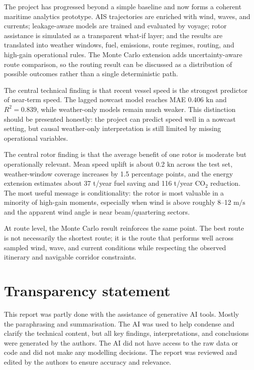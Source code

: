\documentclass[10pt,a4paper]{article}
\newcommand{\kn}{\ensuremath{\mathrm{kn}}}
\newcommand{\ms}{\ensuremath{\mathrm{m/s}}}
\newcommand{\co}{CO$_2$}
\begin{document}
The project has progressed beyond a simple baseline and now forms a coherent
maritime analytics prototype. AIS trajectories are enriched with wind, waves,
and currents; leakage-aware models are trained and evaluated by voyage; rotor
assistance is simulated as a transparent what-if layer; and the results are
translated into weather windows, fuel, emissions, route regimes, routing, and
high-gain operational rules. The Monte Carlo extension adds uncertainty-aware
route comparison, so the routing result can be discussed as a distribution of
possible outcomes rather than a single deterministic path.

The central technical finding is that recent vessel speed is the strongest
predictor of near-term speed. The lagged nowcast model reaches MAE 0.406 \kn{}
and $R^2=0.839$, while weather-only models remain much weaker. This distinction
should be presented honestly: the project can predict speed well in a nowcast
setting, but causal weather-only interpretation is still limited by missing
operational variables.

The central rotor finding is that the average benefit of one rotor is moderate
but operationally relevant. Mean speed uplift is about 0.2 \kn{} across the test
set, weather-window coverage increases by 1.5 percentage points, and the energy
extension estimates about 37 t/year fuel saving and 116 t/year \co{} reduction.
The most useful message is conditionality: the rotor is most valuable in a
minority of high-gain moments, especially when wind is above roughly 8--12
\ms{} and the apparent wind angle is near beam/quartering sectors.

At route level, the Monte Carlo result reinforces the same point. The best route
is not necessarily the shortest route; it is the route that performs well across
sampled wind, wave, and current conditions while respecting the observed
itinerary and navigable corridor constraints.


\section{Transparency statement}
\label{sec:transparency}

This report was partly done with the assistance of generative AI tools. Mostly the paraphrasing and summarisation. 
The AI was used to help condense and clarify the technical content, but all key findings, interpretations, 
and conclusions were generated by the authors. 
The AI did not have access to the raw data or code and did not make any modelling decisions. 
The report was reviewed and edited by the authors to ensure accuracy and relevance.
\end{document}
